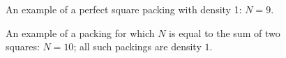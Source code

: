
\begin{figure}[h]
\caption{\label{fig:N9} An example of a perfect square packing with density 1: $N=9$.}
\end{figure}

\begin{figure}[H]

\caption{\label{fig:bravais}An example of a packing for which $N$ is equal to the sum of two squares: $N=10$; all such packings are density $1$.}
\end{figure}

